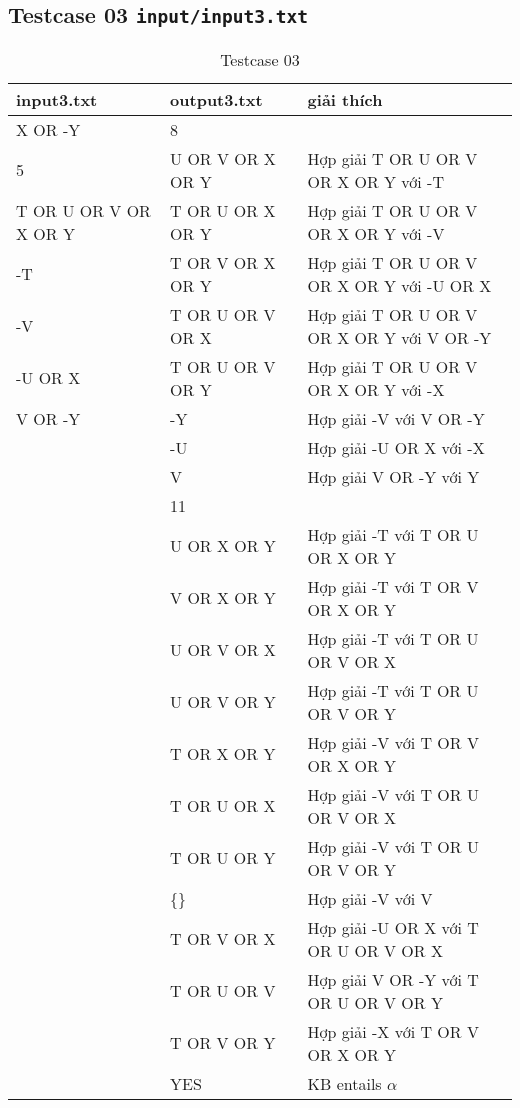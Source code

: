 \documentclass[12pt]{article}
\begin{document}
\subsection{Testcase 03 \texttt{input/input3.txt}}
\begin{table}[H]
    \centering
    \begin{tabular}{|l|l|l|}
        \hline
        input3.txt & output3.txt & giải thích  \\
        \hline
        X OR -Y & 8 & \\
        5 & U OR V OR X OR Y & Hợp giải T OR U OR V OR X OR Y với -T \\
        T OR U OR V OR X OR Y & T OR U OR X OR Y & Hợp giải T OR U OR V OR X OR Y với -V \\
        -T & T OR V OR X OR Y & Hợp giải T OR U OR V OR X OR Y với -U OR X \\
        -V & T OR U OR V OR X & Hợp giải T OR U OR V OR X OR Y với V OR -Y \\
        -U OR X & T OR U OR V OR Y & Hợp giải T OR U OR V OR X OR Y với -X \\
        V OR -Y & -Y & Hợp giải -V với V OR -Y \\
         & -U & Hợp giải -U OR X với -X \\
         & V & Hợp giải V OR -Y với Y \\
         & 11 & \\
         & U OR X OR Y & Hợp giải -T với T OR U OR X OR Y \\
         & V OR X OR Y & Hợp giải -T với T OR V OR X OR Y \\
         & U OR V OR X & Hợp giải -T với T OR U OR V OR X \\
         & U OR V OR Y & Hợp giải -T với T OR U OR V OR Y \\
         & T OR X OR Y & Hợp giải -V với T OR V OR X OR Y \\
         & T OR U OR X & Hợp giải -V với T OR U OR V OR X \\
         & T OR U OR Y & Hợp giải -V với T OR U OR V OR Y \\
         & \{\} & Hợp giải -V với V \\
         & T OR V OR X & Hợp giải -U OR X với T OR U OR V OR X \\
         & T OR U OR V & Hợp giải V OR -Y với T OR U OR V OR Y \\
         & T OR V OR Y & Hợp giải -X với T OR V OR X OR Y \\
         & YES & KB entails $\alpha$ \\
        \hline
    \end{tabular}
    \caption{Testcase 03}
\end{table}
\end{document}
